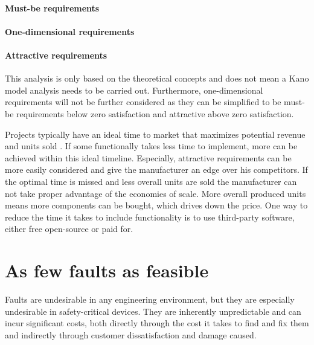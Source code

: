 \paragraph{Must-be requirements}  \autocite{sauerwein1996kano}

\paragraph{One-dimensional requirements} \autocite{sauerwein1996kano}

\paragraph{Attractive requirements} \autocite{sauerwein1996kano}

This analysis is only based on the theoretical concepts and does not mean a Kano model analysis needs to be carried out. Furthermore, one-dimensional requirements will not be further considered as they can be simplified to be must-be requirements below zero satisfaction and attractive above zero satisfaction. 

Projects typically have an ideal time to market that maximizes potential revenue and units sold \cite{stalk1988time}. If some functionally takes less time to implement, more can be achieved within this ideal timeline. Especially, attractive requirements can be more easily considered and give the manufacturer an edge over his competitors. If the optimal time is missed and less overall units are sold the manufacturer can not take proper advantage of the economies of scale. More overall produced units means more components can be bought, which drives down the price. One way to reduce the time it takes to include functionality is to use third-party software, either free open-source or paid for. 

\section{As few faults as feasible}
Faults are undesirable in any engineering environment, but they are especially undesirable in safety-critical devices. They are inherently unpredictable and can incur significant costs, both directly through the cost it takes to find and fix them and indirectly through customer dissatisfaction and damage caused.

